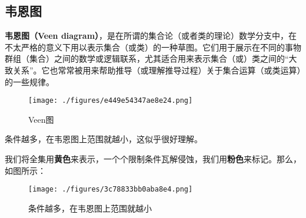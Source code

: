 

\begin{issues}
\issueDraft
\end{issues}


\subsection{韦恩图}
\textbf{韦恩图（Veen diagram）}，是在所谓的集合论（或者类的理论）数学分支中，在不太严格的意义下用以表示集合（或类）的一种草图。它们用于展示在不同的事物群组（集合）之间的数学或逻辑联系，尤其适合用来表示集合（或）类之间的“大致关系”。它也常常被用来帮助推导（或理解推导过程）关于集合运算（或类运算）的一些规律。
\begin{figure}[ht]
\centering
\texttt{[image: ./figures/e449e54347ae8e24.png]}
\caption{Veen图} \label{fig_SufCnd_1}
\end{figure}
   条件越多，在韦恩图上范围就越小，这似乎很好理解。

   我们将全集用\textbf{黄色}来表示，一个个限制条件瓦解侵蚀，我们用\textbf{粉色}来标记。那么，如图所示：
\begin{figure}[ht]
\centering
\texttt{[image: ./figures/3c78833bb0aba8e4.png]}
\caption{条件越多，在韦恩图上范围就越小} \label{fig_SufCnd_6}
\end{figure}
